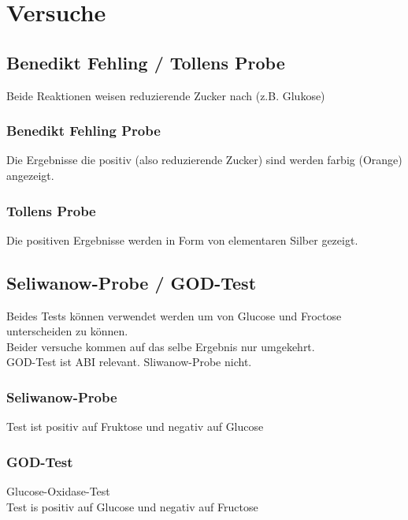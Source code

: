 
\section{Versuche}


\subsection{Benedikt Fehling / Tollens Probe}
Beide Reaktionen weisen reduzierende Zucker nach (z.B. Glukose)
\subsubsection{Benedikt Fehling Probe}
Die Ergebnisse die positiv (also reduzierende Zucker) sind werden farbig (Orange) angezeigt.
\subsubsection{Tollens Probe}
Die positiven Ergebnisse werden in Form von elementaren Silber gezeigt.

\subsection{Seliwanow-Probe / GOD-Test}
Beides Tests können verwendet werden um von Glucose und Froctose unterscheiden zu können. \\
Beider versuche kommen auf das selbe Ergebnis nur umgekehrt. \\
GOD-Test ist ABI relevant. Sliwanow-Probe nicht.
\subsubsection{Seliwanow-Probe}
Test ist positiv auf Fruktose und negativ auf Glucose
\subsubsection{GOD-Test}
Glucose-Oxidase-Test \\
Test is positiv auf Glucose und negativ auf Fructose

